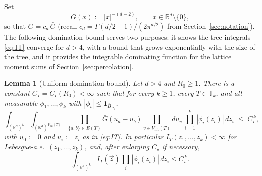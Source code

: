\documentclass[11pt]{article}
\newtheorem{lemma}[theorem]{Lemma}
\theoremstyle{definition}
\theoremstyle{remark}
\newcommand{\R}{\mathbb{R}}
\newcommand{\T}{\mathbb{T}}                    %
\numberwithin{equation}{section}
\theoremstyle{plain}
\theoremstyle{definition}
\theoremstyle{remark}
\theoremstyle{plain}
\begin{document}
Set
\[
\bar G(x):=|x|^{-(d-2)},\qquad x\in\R^d\setminus\{0\},
\]
so that $G=c_d\,\bar G$ (recall $c_d=\Gamma(d/2-1)/(2\pi^{d/2})$ from Section~\ref{sec:notation}). The following domination bound serves two purposes: it
shows the tree integrals \eqref{eq:IT} converge for $d>4$, with a bound that grows exponentially with the size of the tree, and it provides the integrable dominating
function for the lattice moment sums of Section~\ref{sec:percolation}.

\begin{lemma}[Uniform domination bound]\label{lem:envelope}
Let $d>4$ and $R_0\ge1$. There is a constant $C_\star=C_\star(R_0)$$<\infty$
such that for
every $k\ge1$, every $T\in\T_k$, and all measurable
$\phi_1,\dots,\phi_k$ with $|\phi_i|\le\mathbf 1_{\overline B_{R_0}}$,
\begin{equation}\label{eq:envelope}
\int_{(\R^d)^{k}}\int_{(\R^d)^{V_{\mathrm{int}}(T)}}
\prod_{\{a,b\}\in E(T)}\bar G(u_a-u_b)
\prod_{v\in V_{\mathrm{int}}(T)}du_v\,
\prod_{i=1}^k|\phi_i(z_i)|\,dz_i
\;\le\;C_\star^{\,k},
\end{equation}
with $u_0:=0$ and $u_i:=z_i$ as in \eqref{eq:IT}. In particular
$I_T(z_1,\dots,z_k)<\infty$ for Lebesgue-a.e.\ $(z_1,\dots,z_k)$, and, after
enlarging $C_\star$ if necessary,
\[
\int_{(\R^d)^k}I_T(\vec z)\prod_i|\phi_i(z_i)|\,dz_i\le
C_\star^{\,k}.
\]

\end{lemma}
\end{document}
